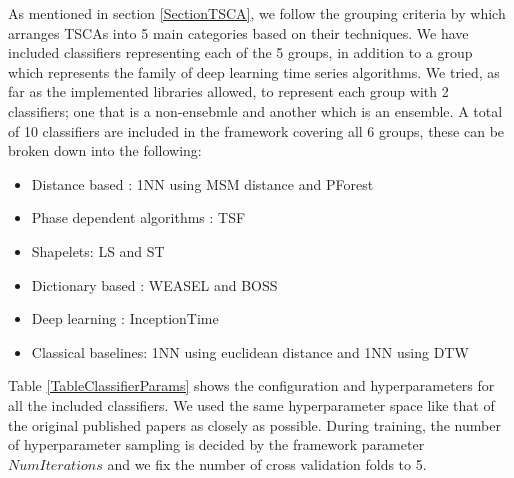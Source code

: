As mentioned in section \ref{SectionTSCA}, we follow the grouping criteria by \cite{bagnall2017great} which arranges TSCAs into 5 main categories based on their techniques.
We have included classifiers representing each of the 5 groups, in addition to a  group which represents the family of deep learning time series algorithms.
We tried, as far as the implemented libraries allowed, to represent each group with 2 classifiers; one that is a non-ensebmle and another which is an ensemble.
A total of 10 classifiers are included in the framework covering all 6 groups, these can be broken down into the following:
\begin{itemize}
  \item Distance based : 1NN using MSM distance and PForest
  \item Phase dependent algorithms : TSF
  \item Shapelets: LS and ST
  \item Dictionary based : WEASEL and BOSS
  \item Deep learning : InceptionTime
  \item Classical baselines: 1NN using euclidean distance and 1NN using DTW
\end{itemize}

Table \ref{TableClassifierParams} shows the configuration and hyperparameters for all the included classifiers.
We used the same hyperparameter space like that of the original published papers as closely as possible.
During training, the number of hyperparameter sampling is decided by the framework parameter $NumIterations$ and we fix the number of cross validation folds to 5.

